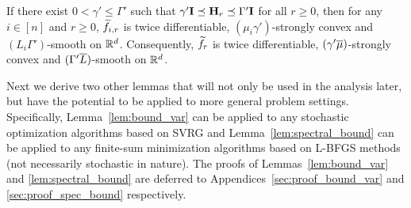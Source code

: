\documentclass[10pt,twocolumn,journal]{IEEEtran}
\begin{document}
\begin{lemma}\label{lem:tilf_sc_sm}
If there exist $0<\gamma'\le \Gamma'$ such that $\gamma'\mathbf{I}\preceq\mathbf{H}_r\preceq\Gamma'\mathbf{I}$ for all $r\ge 0$, then for any $i\in[n]$ and $r\ge 0$, $\widetilde{f}_{i,r}$ is twice differentiable, $(\mu_i\gamma')$-strongly convex and $(L_i\Gamma')$-smooth on $\mathbb{R}^d$. Consequently, $\widetilde{f}_r$ is twice differentiable, $(\gamma'\overline{\mu})$-strongly convex and $(\Gamma'\overline{L})$-smooth on $\mathbb{R}^d$.
\end{lemma}






Next we derive two other lemmas that will not only be used in the analysis later, %
but have the potential to be applied to more general problem settings. Specifically, Lemma~\ref{lem:bound_var} can be applied to any stochastic optimization algorithms based on SVRG and Lemma~\ref{lem:spectral_bound} can be applied to any finite-sum minimization algorithms based on L-BFGS methods (not necessarily stochastic in nature). The proofs of {Lemmas}~\ref{lem:bound_var} and \ref{lem:spectral_bound} are deferred to Appendices~\ref{sec:proof_bound_var} and \ref{sec:proof_spec_bound} respectively. 
\end{document}
